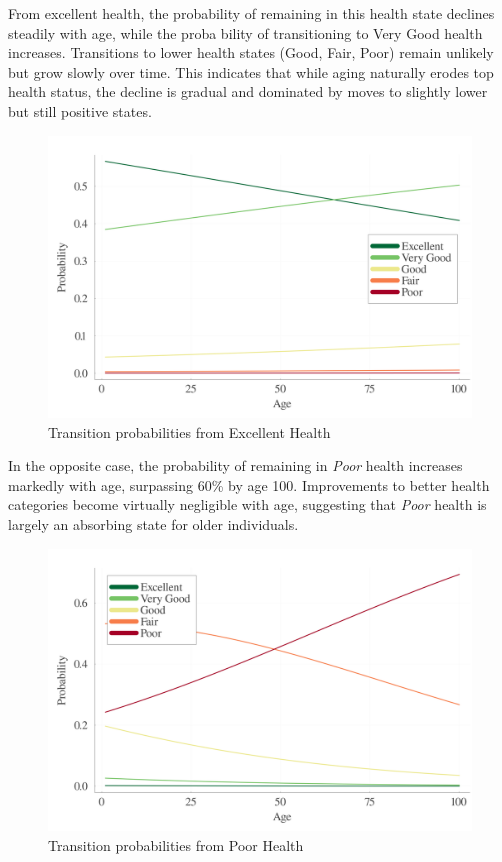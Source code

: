 \documentclass{article}
\begin{document}
From excellent health, the probability of
remaining in this health state declines steadily with age, while the proba
bility of transitioning to Very Good health increases. Transitions to lower
health states (Good, Fair, Poor) remain unlikely but grow slowly over
time. This indicates that while aging naturally erodes top health status,
the decline is gradual and dominated by moves to slightly lower but still
positive states.

\begin{figure}[H]\label{fig:health_transition_1}
    \begin{center}
        \includegraphics[width=\linewidth]{output/health_transition_1.png}
        \caption{Transition probabilities from Excellent Health}    
    \end{center}
\end{figure}

In the opposite case, the probability of remaining in \textit{Poor} health increases markedly with age, surpassing 60\% by age 100.
Improvements to better health categories become virtually negligible with age, suggesting that \textit{Poor} health is largely an absorbing state for older individuals.
\begin{figure}\label{fig:health_transition_5}
    \begin{center}
        \includegraphics[width=\linewidth]{output/health_transition_5.png}
        \caption{Transition probabilities from Poor Health}   
    \end{center} 
\end{figure}
\end{document}
